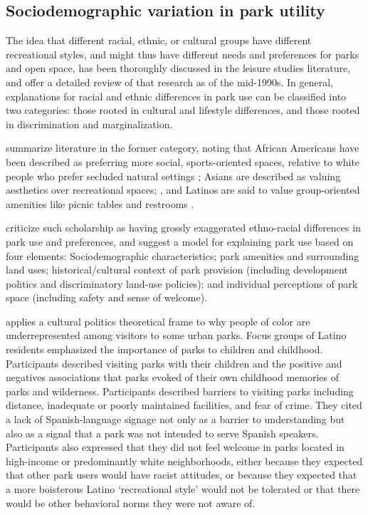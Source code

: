 \documentclass[]{elsarticle} %
\begin{document}
\hypertarget{sociodemographic-variation-in-park-utility}{%
\subsection{Sociodemographic variation in park utility}\label{sociodemographic-variation-in-park-utility}}

The idea that different racial, ethnic, or cultural groups have different
recreational styles, and might thus have different needs and preferences for
parks and open space, has been thoroughly discussed in the leisure studies
literature, and \citet{husbands1995ethnicity} offer a detailed review of that research
as of the mid-1990s. In general, explanations for racial and ethnic differences
in park use can be classified into two categories: those rooted in cultural and
lifestyle differences, and those rooted in discrimination and marginalization.

\citet{byrne2009nature} summarize literature in the former category, noting that
African Americans have been described as preferring more social,
sports-oriented spaces, relative to white people who prefer secluded natural
settings \citep{washburne1978black, hutchison1987ethnicity, floyd1999convergence, gobster2002managing, payne2002examination, ho2005gender}; Asians are
described as valuing aesthetics over recreational spaces;
\citep{gobster2002managing, payne2002examination, ho2005gender}, and Latinos are
said to value group-oriented amenities like picnic tables and restrooms
\citep{baas1993influence, hutchison1987ethnicity, irwin1990mexican}.

\citet{byrne2009nature} criticize such scholarship as having grossly exaggerated
ethno-racial differences in park use and preferences, and suggest a model for
explaining park use based on four elements: Sociodemographic characteristics;
park amenities and surrounding land uses; historical/cultural context of park
provision (including development politics and discriminatory land-use
policies); and individual perceptions of park space (including safety and
sense of welcome).

\citet{byrne2012green} applies a cultural politics theoretical frame to why people of
color are underrepresented among visitors to some urban parks. Focus groups of
Latino residents emphasized the importance of parks to children and childhood.
Participants described visiting parks with their children and the positive and
negatives associations that parks evoked of their own childhood memories of
parks and wilderness. Participants described barriers to visiting parks
including distance, inadequate or poorly maintained facilities, and fear of
crime. They cited a lack of Spanish-language signage not only as a barrier to
understanding but also as a signal that a park was not intended to serve
Spanish speakers. Participants also expressed that they did not feel welcome
in parks located in high-income or predominantly white neighborhoods, either
because they expected that other park users would have racist attitudes, or
because they expected that a more boisterous Latino `recreational style' would
not be tolerated or that there would be other behavioral norms they were not
aware of.
\end{document}
